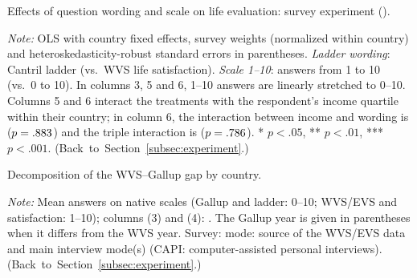 \documentclass[12pt]{article}
\begin{document}
\begin{table}[htbp]
    \centering
    \caption{Effects of question wording and scale on life evaluation: survey experiment (\newsurvey).}\label{tab:fabre_regressions}
    \begin{adjustbox}{max width=\textwidth}
    
    \end{adjustbox}
    \begin{minipage}{\textwidth}\footnotesize \textit{Note:} OLS with country fixed effects, survey weights (normalized within country) and heteroskedasticity-robust standard errors in parentheses. \textit{Ladder wording}: Cantril ladder (vs.\ WVS life satisfaction). \textit{Scale 1--10}: answers from 1 to 10 (vs.\ 0 to 10). In columns 3, 5 and 6, 1--10 answers are linearly stretched to 0--10. Columns 5 and 6 interact the treatments with the respondent's income quartile within their country; in column 6, the interaction between income and wording is \interactionLadderIncomeFull ($p = .883$) and the triple interaction is \tripleInteraction ($p = .786$). * $p<.05$, ** $p<.01$, *** $p<.001$. \hfill(Back~to~Section~\ref{subsec:experiment}.)\end{minipage}
\end{table}

\begin{table}[htbp]
    \centering
    \caption{Decomposition of the WVS--Gallup gap by country.}\label{tab:decomposition_country}
    \begin{adjustbox}{max width=\textwidth}
    
    \end{adjustbox}
    \begin{minipage}{\textwidth}\footnotesize \textit{Note:} Mean answers on native scales (Gallup and ladder: 0--10; WVS/EVS and satisfaction: 1--10); columns (3) and (4): \newsurvey. The Gallup year is given in parentheses when it differs from the WVS year. Survey: mode: source of the WVS/EVS data and main interview mode(s) (CAPI: computer-assisted personal interviews). \hfill(Back~to~Section~\ref{subsec:experiment}.)\end{minipage}
\end{table}
\end{document}
